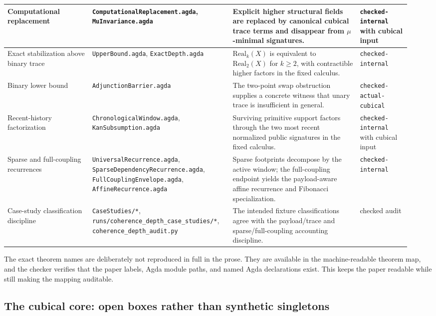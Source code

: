 \begin{center}
\begin{tabular}{p{0.20\linewidth}p{0.32\linewidth}p{0.30\linewidth}p{0.12\linewidth}}
\hline
Computational replacement
& \texttt{ComputationalReplacement.agda}, \texttt{MuInvariance.agda}
& Explicit higher structural fields are replaced by canonical cubical trace terms and disappear
from \(\mu\)-minimal signatures. & \texttt{checked-internal} with cubical input \\
\hline
Exact stabilization above binary trace
& \texttt{UpperBound.agda}, \texttt{ExactDepth.agda}
& \(\mathrm{Real}_k(X)\) is equivalent to \(\mathrm{Real}_2(X)\) for \(k\geq 2\), with
contractible higher factors in the fixed calculus. & \texttt{checked-internal} \\
\hline
Binary lower bound
& \texttt{AdjunctionBarrier.agda}
& The two-point swap obstruction supplies a concrete witness that unary trace is insufficient
in general. & \texttt{checked-actual-cubical} \\
\hline
Recent-history factorization
& \texttt{ChronologicalWindow.agda}, \texttt{KanSubsumption.agda}
& Surviving primitive support factors through the two most recent normalized public signatures
in the fixed calculus. & \texttt{checked-internal} with cubical input \\
\hline
Sparse and full-coupling recurrences
& \texttt{UniversalRecurrence.agda}, \texttt{SparseDependencyRecurrence.agda},
\texttt{FullCouplingEnvelope.agda}, \texttt{AffineRecurrence.agda}
& Sparse footprints decompose by the active window; the full-coupling endpoint yields the
payload-aware affine recurrence and Fibonacci specialization. & \texttt{checked-internal} \\
\hline
Case-study classification discipline
& \texttt{CaseStudies/*}, \texttt{runs/coherence\_depth\_case\_studies/*},
\texttt{coherence\_depth\_audit.py}
& The intended fixture classifications agree with the payload/trace and sparse/full-coupling
accounting discipline. & checked audit \\
\hline
\end{tabular}
\end{center}

The exact theorem names are deliberately not reproduced in full in the prose.  They are
available in the machine-readable theorem map, and the checker verifies that the paper labels,
Agda module paths, and named Agda declarations exist.  This keeps the paper readable while
still making the mapping auditable.

\subsection{The cubical core: open boxes rather than synthetic singletons}
\label{subsec:cubical-core-artifact}

